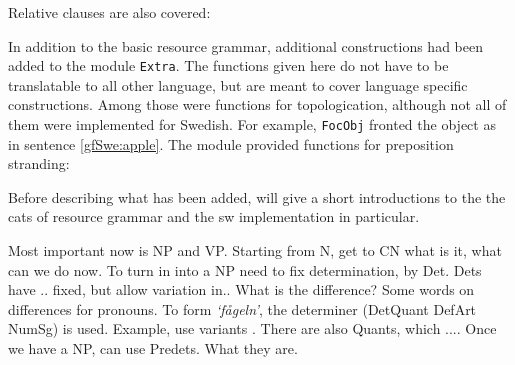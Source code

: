 \documentclass{report}
\begin{document}
Relative clauses are also covered: 

In addition to the basic resource grammar, additional constructions had been added
to the module \verb|Extra|. The functions given here do not have to be translatable
to all other language, but are meant to cover language specific constructions.
Among those were functions for topologication, although not all
of them were implemented for Swedish.
For example, \verb|FocObj| fronted the object as in sentence \ref{gfSwe:apple}.
\label{gfSwe:apple}
The module provided functions for preposition stranding:



Before describing what has been added, will give a short introductions to the
the cats of resource grammar and the sw implementation in particular.

Most important now is NP and VP.
Starting from N, get to CN what is it, what can we do now.
To turn in into a NP need to fix determination, by Det. Dets have .. fixed,
but allow variation in.. 
What is the difference? Some words on differences for pronouns.
To form \emph{`fågeln'}, the determiner (DetQuant DefArt NumSg) is used.
Example, use variants {}.
There are also Quants, which .... 
Once we have a NP, can use Predets. What they are.
\end{document}
